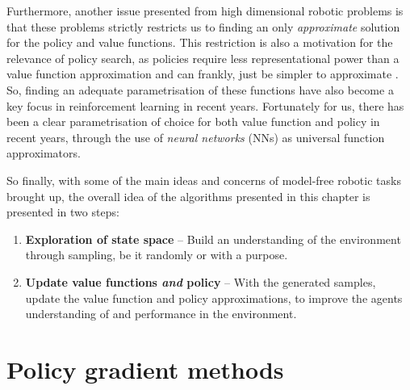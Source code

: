 Furthermore, another issue presented from high dimensional robotic problems is that these problems strictly restricts us to finding an only \textit{approximate} solution for the policy and value functions.
This restriction is also a motivation for the relevance of policy search, as policies require less representational power than a value function approximation \cite{BagnellPolicySearch2003} and can frankly, just be simpler to approximate \cite{suttonAndBartoBook}.
So, finding an adequate parametrisation of these functions have also become a key focus in reinforcement learning in recent years.
Fortunately for us, there has been a clear parametrisation of choice for both value function and policy in recent years, through the use of \textit{neural networks} (NNs) as universal function approximators.


So finally, with some of the main ideas and concerns of model-free robotic tasks brought up, the overall idea of the algorithms presented in this chapter is presented in two steps:
\begin{enumerate}
    \item \textbf{Exploration of state space} -- Build an understanding of the environment through sampling, be it randomly or with a purpose.
    \item \textbf{Update value functions \textit{and} policy} -- With the generated samples, update the value function and policy approximations, to improve the agents understanding of and performance in the environment.
\end{enumerate} 



\section{Policy gradient methods}

